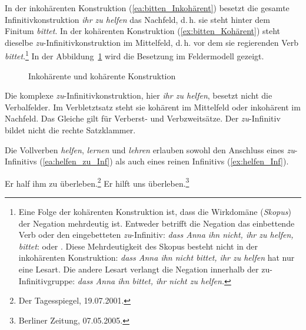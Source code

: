 In der inkohärenten Konstruktion (\ref{ea:bitten_Inkohärent}) besetzt die gesamte Infinitivkonstruktion \textit{ihr zu helfen} das Nachfeld, d.\,h. sie steht hinter dem Finitum \textit{bittet}. In der kohärenten Konstruktion (\ref{ex:bitten_Kohärent}) steht dieselbe \textit{zu}-Infinitivkonstruktion im Mittelfeld, d.\,h. vor dem sie regierenden Verb \textit{bittet}.\footnote{Eine Folge der kohärenten Konstruktion ist, dass die Wirkdomäne (\textit{Skopus}) der Negation mehrdeutig ist. Entweder betrifft die Negation das einbettende Verb oder den eingebetteten \textit{zu}-Infinitiv: \textit{dass Anna ihn nicht, ihr zu helfen, bittet}:  oder . Diese Mehrdeutigkeit des Skopus besteht nicht in der inkohärenten Konstruktion: \textit{dass Anna ihn nicht bittet, ihr zu helfen} hat nur eine Lesart. Die andere Lesart verlangt die Negation innerhalb der zu-Infinitivgruppe: \textit{dass Anna ihn bittet, ihr nicht zu helfen.}} In der Abbildung~\ref{fig:In_Kohärente_Konstruktion} wird die Besetzung im Feldermodell gezeigt.

\begin{figure}[!htbp]
  \centering
  \caption{Inkohärente und kohärente Konstruktion}
  \label{fig:In_Kohärente_Konstruktion}
\end{figure} 

Die komplexe \textit{zu}-Infinitivkonstruktion, hier \textit{ihr zu helfen}, besetzt nicht die Verbalfelder. Im Verbletztsatz steht sie kohärent im Mittelfeld oder inkohärent im Nachfeld. Das Gleiche gilt für Verberst- und Verbzweitsätze. Der \textit{zu}-Infinitiv bildet nicht die rechte Satzklammer.  

Die Vollverben \textit{helfen}, \textit{lernen} und \textit{lehren} erlauben sowohl den Anschluss eines \textit{zu}-Infinitivs (\ref{ea:helfen_zu_Inf}) als auch eines reinen Infinitivs (\ref{ex:helfen_Inf}). 

\ea \label{ea:helfen_(zu)_Inf}
\ea \label{ea:helfen_zu_Inf} Er half ihm zu überleben.\footnote{Der Tagesspiegel, 19.07.2001.}
\ex \label{ex:helfen_Inf} Er hilft uns überleben.\footnote{Berliner Zeitung, 07.05.2005.}
\z 
\z 

